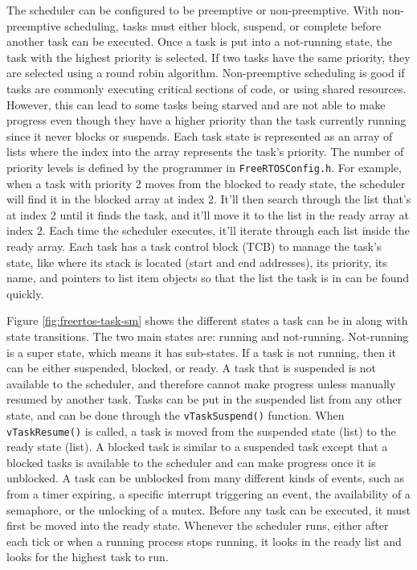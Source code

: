 The scheduler can be configured to be preemptive or non-preemptive. With
non-preemptive scheduling, tasks must either block, suspend, or complete before
another task can be executed. Once a task is put into a not-running state, the
task with the highest priority is selected. If two tasks have the same priority,
they are selected using a round robin algorithm. Non-preemptive scheduling is
good if tasks are commonly executing critical sections of code, or using shared
resources.  However, this can lead to some tasks being starved and are not able
to make progress even though they have a higher priority than the task currently
running since it never blocks or suspends. Each task state is represented as an
array of lists where the index into the array represents the task's priority.
The number of priority levels is defined by the programmer in \texttt{FreeRTOSConfig.h}.
For example, when a task with priority 2 moves from the blocked to ready state,
the scheduler will find it in the blocked array at index 2. It'll then search
through the list that's at index 2 until it finds the task, and it'll move it to
the list in the ready array at index 2. Each time the scheduler executes, it'll
iterate through each list inside the ready array. Each task has a task control
block (TCB) to manage the task's state, like where its stack is located (start
and end addresses), its priority, its name, and pointers to list item objects so
that the list the task is in can be found quickly.

Figure \ref{fig:freertos-task-sm} shows the different states a task can be in
along with state transitions. The two main states are: running and not-running.
Not-running is a super state, which means it has sub-states. If a task is not
running, then it can be either suspended, blocked, or ready. A task that is
suspended is not available to the scheduler, and therefore cannot make progress
unless manually resumed by another task. Tasks can be put in the suspended list
from any other state, and can be done through the \texttt{vTaskSuspend()} function. When
\texttt{vTaskResume()} is called, a task is moved from the suspended state (list) to the
ready state (list). A blocked task is similar to a suspended task except that a
blocked tasks is available to the scheduler and can make progress once it is
unblocked. A task can be unblocked from many different kinds of events, such as
from a timer expiring, a specific interrupt triggering an event, the
availability of a semaphore, or the unlocking of a mutex. Before any task can be
executed, it must first be moved into the ready state. Whenever the scheduler
runs, either after each tick or when a running process stops running, it looks
in the ready list and looks for the highest task to run.


